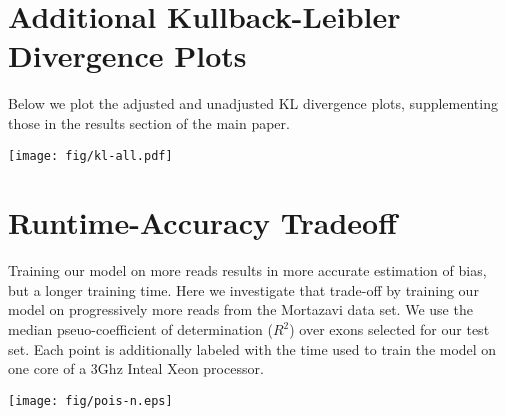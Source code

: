 \documentclass[letterpaper]{article}
\begin{document}
\section{Additional Kullback-Leibler Divergence Plots}

Below we plot the adjusted and unadjusted KL divergence plots, supplementing
those in the results section of the main paper.


\texttt{[image: fig/kl-all.pdf]}


\section{Runtime-Accuracy Tradeoff}

Training our model on more reads results in more accurate estimation of bias,
but a longer training time. Here we investigate that trade-off by training our
model on progressively more reads from the Mortazavi data set. We use the
median pseuo-coefficient of determination ($R^2$) over exons selected for our
test set. Each point is additionally labeled with the time used to train the
model on one core of a 3Ghz Inteal Xeon processor.

\texttt{[image: fig/pois-n.eps]}




\end{document}
